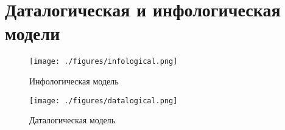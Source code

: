 \section{Даталогическая и инфологическая модели}

\begin{figure}[h!]
  \centering
  \texttt{[image: ./figures/infological.png]}
  \caption{Инфологическая модель}
\end{figure}

\begin{figure}[h!]
  \centering
  \texttt{[image: ./figures/datalogical.png]}
  \caption{Даталогическая модель}
\end{figure}
\clearpage

\inputminted[breaklines]{sql}{../sql/create.sql}

\inputminted[breaklines]{sql}{../sql/test.sql}

\inputminted[breaklines]{sql}{../sql/delete.sql}
